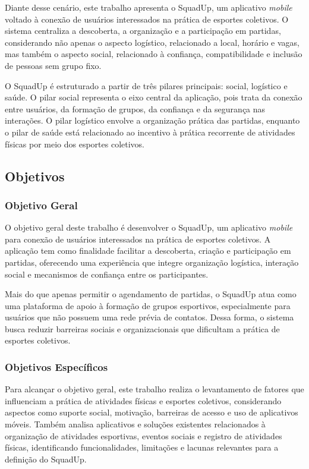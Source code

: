 \documentclass[a4paper, 12pt]{article}
\begin{document}
\begin{justify}
Diante desse cenário, este trabalho apresenta o SquadUp, um aplicativo \textit{mobile} voltado à conexão de usuários interessados na prática de esportes coletivos. O sistema centraliza a descoberta, a organização e a participação em partidas, considerando não apenas o aspecto logístico, relacionado a local, horário e vagas, mas também o aspecto social, relacionado à confiança, compatibilidade e inclusão de pessoas sem grupo fixo.

O SquadUp é estruturado a partir de três pilares principais: social, logístico e saúde. O pilar social representa o eixo central da aplicação, pois trata da conexão entre usuários, da formação de grupos, da confiança e da segurança nas interações. O pilar logístico envolve a organização prática das partidas, enquanto o pilar de saúde está relacionado ao incentivo à prática recorrente de atividades físicas por meio dos esportes coletivos.

\subsection{Objetivos}

\subsubsection{Objetivo Geral}

O objetivo geral deste trabalho é desenvolver o SquadUp, um aplicativo \textit{mobile} para conexão de usuários interessados na prática de esportes coletivos. A aplicação tem como finalidade facilitar a descoberta, criação e participação em partidas, oferecendo uma experiência que integre organização logística, interação social e mecanismos de confiança entre os participantes.

Mais do que apenas permitir o agendamento de partidas, o SquadUp atua como uma plataforma de apoio à formação de grupos esportivos, especialmente para usuários que não possuem uma rede prévia de contatos. Dessa forma, o sistema busca reduzir barreiras sociais e organizacionais que dificultam a prática de esportes coletivos.

\subsubsection{Objetivos Específicos}

Para alcançar o objetivo geral, este trabalho realiza o levantamento de fatores que influenciam a prática de atividades físicas e esportes coletivos, considerando aspectos como suporte social, motivação, barreiras de acesso e uso de aplicativos móveis. Também analisa aplicativos e soluções existentes relacionados à organização de atividades esportivas, eventos sociais e registro de atividades físicas, identificando funcionalidades, limitações e lacunas relevantes para a definição do SquadUp.


\end{justify}
\end{document}
